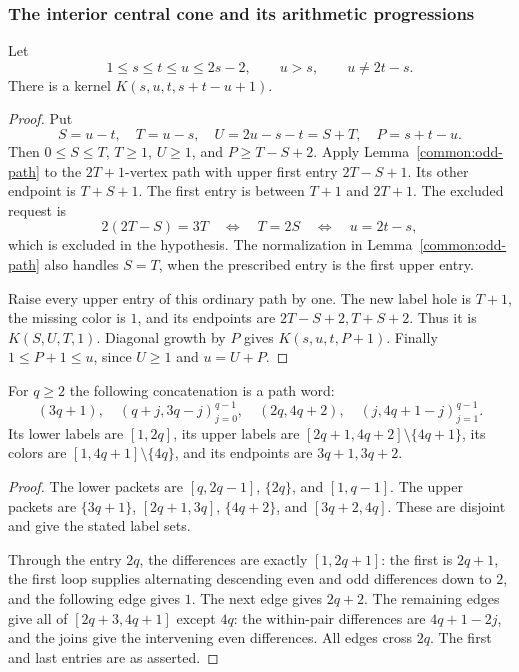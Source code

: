 \subsubsection{The interior central cone and its arithmetic progressions}

\begin{lemma}\label{ok:central-kernel}
Let
\[
 1\le s\le t\le u\le2s-2,\qquad u>s,\qquad u\ne2t-s.
 \]
There is a kernel $K(s,u,t,s+t-u+1)$.
\end{lemma}
\begin{proof}
Put
\[
 S=u-t,\quad T=u-s,\quad U=2u-s-t=S+T,\quad P=s+t-u.
 \]
Then $0\le S\le T$, $T\ge1$, $U\ge1$, and
$P\ge T-S+2$. Apply Lemma~\ref{common:odd-path} to the
$2T+1$-vertex path with upper first entry $2T-S+1$.
Its other endpoint is $T+S+1$. The first entry is between
$T+1$ and $2T+1$. The excluded request is
\[
 2(2T-S)=3T\quad\Longleftrightarrow\quad T=2S
 \quad\Longleftrightarrow\quad u=2t-s,
 \]
which is excluded in the hypothesis. The normalization in
Lemma~\ref{common:odd-path} also handles $S=T$, when the prescribed
entry is the first upper entry.

Raise every upper entry of this ordinary path by one. The new label
hole is $T+1$, the missing color is $1$, and its endpoints are
$2T-S+2,T+S+2$. Thus it is $K(S,U,T,1)$.
Diagonal growth by $P$ gives $K(s,u,t,P+1)$.
Finally $1\le P+1\le u$, since $U\ge1$ and $u=U+P$.
\end{proof}

\begin{lemma}\label{ok:near-max-word}
For $q\ge2$ the following concatenation is a path word:
\[
 (3q+1),\quad
 (q+j,3q-j)_{j=0}^{q-1},\quad
 (2q,4q+2),\quad
 (j,4q+1-j)_{j=1}^{q-1}.
 \tag{*}\label{ok:near-max-formula}
 \]
Its lower labels are $[1,2q]$, its upper labels are
$[2q+1,4q+2]\setminus\{4q+1\}$, its colors are
$[1,4q+1]\setminus\{4q\}$, and its endpoints are $3q+1,3q+2$.
\end{lemma}
\begin{proof}
The lower packets are $[q,2q-1]$, $\{2q\}$, and $[1,q-1]$.
The upper packets are $\{3q+1\}$, $[2q+1,3q]$,
$\{4q+2\}$, and $[3q+2,4q]$. These are disjoint and give
the stated label sets.

Through the entry $2q$, the differences are exactly $[1,2q+1]$:
the first is $2q+1$, the first loop supplies alternating descending
even and odd differences down to $2$, and the following edge gives
$1$. The next edge gives $2q+2$. The remaining edges give all of
$[2q+3,4q+1]$ except $4q$: the within-pair differences are
$4q+1-2j$, and the joins give the intervening even differences.
All edges cross $2q$. The first and last entries are as asserted.
\end{proof}


